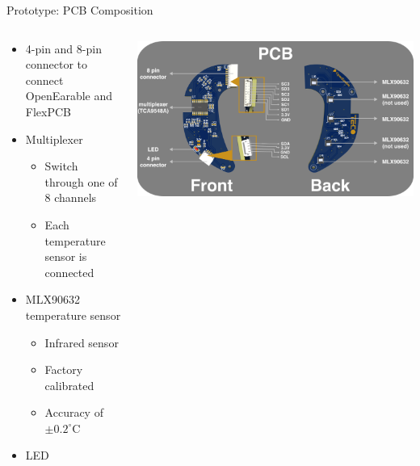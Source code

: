 \documentclass[en]{sdqbeamer}
\begin{document}
\begin{frame}{Prototype: PCB Composition}
    \begin{columns}[T]
        \begin{column}{.34\textwidth}
          \begin{itemize}
              \item 4-pin and 8-pin connector to connect OpenEarable and FlexPCB
              \item Multiplexer
              \begin{itemize}
                  \item Switch through one of 8 channels
                  \item Each temperature sensor is connected
              \end{itemize}
              \item MLX90632 temperature sensor
              \begin{itemize}
                  \item Infrared sensor
                  \item Factory calibrated
                  \item Accuracy of $\pm0.2^\circ\text{C}$
              \end{itemize}
              \item LED
          \end{itemize}
        \end{column}
        
        \begin{column}{.64\textwidth}
          \includegraphics[width=0.95\linewidth]{../thesis-doc/images/prototype/PCB_Description.png}
        \end{column}
      \end{columns}
\end{frame}
\end{document}
